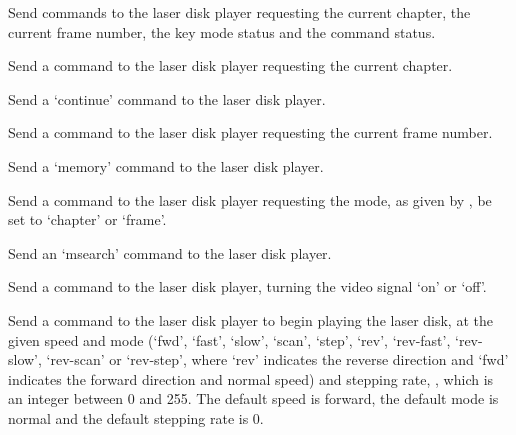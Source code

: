   
  
  
  
  
  
  
  \objListIOEnd






\objItemCommands[]

  \objListCmdBegin
  
  Send commands to the laser disk player requesting the current chapter, the current frame number,
  the key mode status and the command status.
  
  Send a command to the laser disk player requesting the current chapter.
  
  Send a `continue' command to the laser disk player.
  
  Send a command to the laser disk player requesting the current frame number.
  
  Send a `memory' command to the laser disk player.
  
  Send a command to the laser disk player requesting the mode, as given by , be
  set to `chapter' or `frame'.
  
  Send an `msearch' command to the laser disk player.
  
  Send a command to the laser disk player, turning the video signal `on' or `off'.
  
  Send a command to the laser disk player to begin playing the laser disk, at the given speed and
  mode (`fwd', `fast', `slow', `scan', `step', `rev', `rev-fast', `rev-slow', `rev-scan' or
  `rev-step', where `rev' indicates the reverse direction and `fwd' indicates the forward direction
  and normal speed) and stepping rate, , which is an integer between 0 and 255.
  The default speed is forward, the default mode is normal and the default stepping rate is 0.
  
